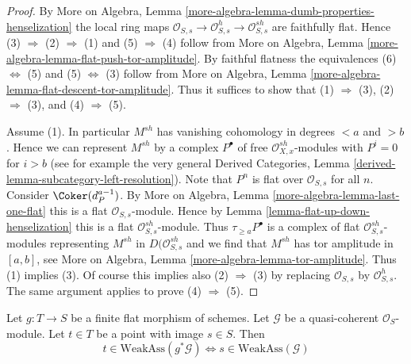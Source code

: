 \begin{proof}
By More on Algebra, Lemma
\ref{more-algebra-lemma-dumb-properties-henselization}
the local ring maps
$\mathcal{O}_{S, s} \to \mathcal{O}_{S, s}^h \to \mathcal{O}_{S, s}^{sh}$
are faithfully flat.
Hence (3) $\Rightarrow$ (2) $\Rightarrow$ (1) and
(5) $\Rightarrow$ (4) follow from
More on Algebra, Lemma \ref{more-algebra-lemma-flat-push-tor-amplitude}.
By faithful flatness the equivalences (6) $\Leftrightarrow$ (5) and
(5) $\Leftrightarrow$ (3) follow from
More on Algebra, Lemma \ref{more-algebra-lemma-flat-descent-tor-amplitude}.
Thus it suffices to show that
(1) $\Rightarrow$ (3), (2) $\Rightarrow$ (3), and (4) $\Rightarrow$ (5).

\medskip\noindent
Assume (1). In particular $M^{sh}$ has vanishing cohomology
in degrees $< a$ and $> b$. Hence we can represent $M^{sh}$ by a complex
$P^\bullet$ of free $\mathcal{O}_{X, x}^{sh}$-modules with
$P^i = 0$ for $i > b$
(see for example the very general
Derived Categories, Lemma \ref{derived-lemma-subcategory-left-resolution}).
Note that $P^n$ is flat over $\mathcal{O}_{S, s}$ for all $n$.
Consider $\Coker(d_P^{a - 1})$. By More on Algebra, Lemma
\ref{more-algebra-lemma-last-one-flat}
this is a flat $\mathcal{O}_{S, s}$-module.
Hence by Lemma \ref{lemma-flat-up-down-henselization}
this is a flat $\mathcal{O}_{S, s}^{sh}$-module.
Thus $\tau_{\geq a}P^\bullet$ is a complex of
flat $\mathcal{O}_{S, s}^{sh}$-modules representing $M^{sh}$
in $D(\mathcal{O}_{S, s}^{sh}$ and we find that
$M^{sh}$ has tor amplitude in $[a, b]$, see
More on Algebra, Lemma \ref{more-algebra-lemma-tor-amplitude}.
Thus (1) implies (3). Of course this implies also
(2) $\Rightarrow$ (3) by replacing $\mathcal{O}_{S, s}$ by
$\mathcal{O}_{S, s}^h$. The same argument applies to prove
(4) $\Rightarrow$ (5).
\end{proof}

\begin{lemma}
\label{lemma-finite-flat-weak-assassin-up-down}
Let $g : T \to S$ be a finite flat morphism of schemes.
Let $\mathcal{G}$ be a quasi-coherent $\mathcal{O}_S$-module.
Let $t \in T$ be a point with image $s \in S$. Then
$$
t \in \text{WeakAss}(g^*\mathcal{G})
\Leftrightarrow
s \in \text{WeakAss}(\mathcal{G})
$$
\end{lemma}

